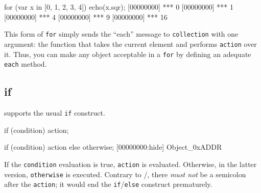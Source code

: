 \begin{urbiscript}[caption=Iterating over a collection with for, label=lst:foreach,
  float=\floatpos]
for (var x in [0, 1, 2, 3, 4])
  echo(x.sqr);
[00000000] *** 0
[00000000] *** 1
[00000000] *** 4
[00000000] *** 9
[00000000] *** 16
\end{urbiscript}

This form of \lstinline|for| simply sends the ``each'' message to
\lstinline|collection| with one argument: the function that takes the
current element and performs \lstinline|action| over it. Thus, you can
make any object acceptable in a \lstinline|for| by defining an
adequate \lstinline|each| method.


\subsection{if}

\us supports the usual \lstinline|if| construct.

\begin{urbiscript}[frame=, backgroundcolor=, ]
if (condition)
  action;

if (condition)
  action
else
  otherwise;
[00000000:hide] Object_0xADDR
\end{urbiscript}

If the \lstinline|condition| evaluation is true, \lstinline|action| is
evaluated. Otherwise, in the latter version, \lstinline|otherwise| is
executed.  Contrary to \C/\Cxx, there \emph{must not} be a semicolon
after the \lstinline|action|; it would end the
\lstinline|if|/\lstinline|else| construct prematurely.

